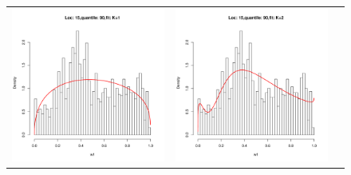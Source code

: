 \documentclass[10pt]{report}
\begin{document}
\begin{figure}[h]
\begin{tabular}{ccc}
\includegraphics[width=\textwidth/3]{../img/loc15/quantile90/fit_K1.pdf}
&
\includegraphics[width=\textwidth/3]{../img/loc15/quantile90/fit_K2.pdf}
&

\end{tabular}
\end{figure}
\end{document}
